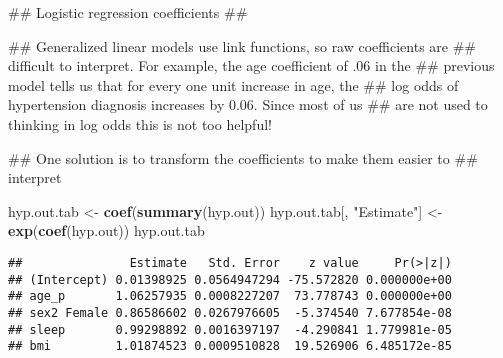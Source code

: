 \documentclass[]{article}
\newenvironment{Shaded}{\begin{snugshade}}{\end{snugshade}}
\newcommand{\KeywordTok}[1]{\textcolor[rgb]{0.13,0.29,0.53}{\textbf{#1}}}
\newcommand{\StringTok}[1]{\textcolor[rgb]{0.31,0.60,0.02}{#1}}
\newcommand{\NormalTok}[1]{#1}
\begin{document}
\begin{Shaded}
\begin{Highlighting}[]
\NormalTok{## Logistic regression coefficients}
\NormalTok{##}

\NormalTok{##   Generalized linear models use link functions, so raw coefficients are}
\NormalTok{##   difficult to interpret. For example, the age coefficient of .06 in the}
\NormalTok{##   previous model tells us that for every one unit increase in age, the}
\NormalTok{##   log odds of hypertension diagnosis increases by 0.06. Since most of us}
\NormalTok{##   are not used to thinking in log odds this is not too helpful!}

\NormalTok{##   One solution is to transform the coefficients to make them easier to}
\NormalTok{##   interpret}

\NormalTok{hyp.out.tab <-}\StringTok{ }\KeywordTok{coef}\NormalTok{(}\KeywordTok{summary}\NormalTok{(hyp.out))}
\NormalTok{hyp.out.tab[, }\StringTok{"Estimate"}\NormalTok{] <-}\StringTok{ }\KeywordTok{exp}\NormalTok{(}\KeywordTok{coef}\NormalTok{(hyp.out))}
\NormalTok{hyp.out.tab}
\end{Highlighting}
\end{Shaded}

\begin{verbatim}
##               Estimate   Std. Error    z value     Pr(>|z|)
## (Intercept) 0.01398925 0.0564947294 -75.572820 0.000000e+00
## age_p       1.06257935 0.0008227207  73.778743 0.000000e+00
## sex2 Female 0.86586602 0.0267976605  -5.374540 7.677854e-08
## sleep       0.99298892 0.0016397197  -4.290841 1.779981e-05
## bmi         1.01874523 0.0009510828  19.526906 6.485172e-85
\end{verbatim}
\end{document}
